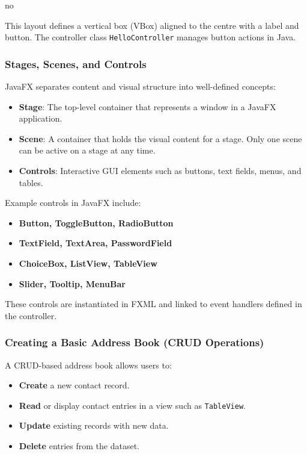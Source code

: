 no\documentclass{article}
\newcommand{\codecmd}[1]{\textcolor[rgb]{0,0.5,0}{\texttt{#1}}}
\begin{document}
This layout defines a vertical box (VBox) aligned to the centre with a label and button. The controller class \codecmd{HelloController} manages button actions in Java.

\subsubsection{Stages, Scenes, and Controls}

JavaFX separates content and visual structure into well-defined concepts:

\begin{itemize}
    \item \textbf{Stage}: The top-level container that represents a window in a JavaFX application.
    \item \textbf{Scene}: A container that holds the visual content for a stage. Only one scene can be active on a stage at any time.
    \item \textbf{Controls}: Interactive GUI elements such as buttons, text fields, menus, and tables.
\end{itemize}

Example controls in JavaFX include:

\begin{itemize}
    \item \textbf{Button, ToggleButton, RadioButton}
    \item \textbf{TextField, TextArea, PasswordField}
    \item \textbf{ChoiceBox, ListView, TableView}
    \item \textbf{Slider, Tooltip, MenuBar}
\end{itemize}

These controls are instantiated in FXML and linked to event handlers defined in the controller.

\subsubsection{Creating a Basic Address Book (CRUD Operations)}

A CRUD-based address book allows users to:

\begin{itemize}
    \item \textbf{Create} a new contact record.
    \item \textbf{Read} or display contact entries in a view such as \codecmd{TableView}.
    \item \textbf{Update} existing records with new data.
    \item \textbf{Delete} entries from the dataset.
\end{itemize}
\end{document}
